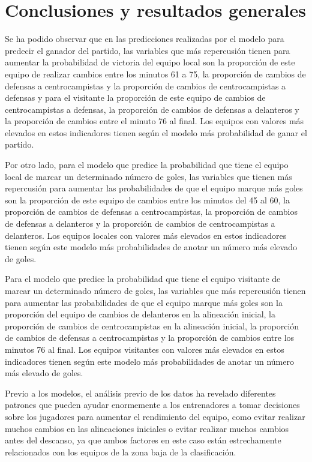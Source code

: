 \section{Conclusiones y resultados generales}
Se ha podido observar que en las predicciones realizadas por el modelo para predecir el ganador 
del partido, las variables que más repercusión tienen para aumentar la probabilidad de victoria del
equipo local son la proporción de este equipo de realizar cambios entre los minutos 61 a 75, la
proporción de cambios de defensas a centrocampistas y la proporción de cambios de
centrocampistas a defensas y para el visitante la proporción de este equipo de cambios de
centrocampistas a defensas, la proporción de cambios de defensas a delanteros y la proporción de 
cambios entre el minuto 76 al final. Los equipos con valores más elevados en estos indicadores 
tienen según el modelo más probabilidad de ganar el partido.

Por otro lado, para el modelo que predice la probabilidad que tiene el equipo local de marcar un 
determinado número de goles, las variables que tienen más repercusión para aumentar las 
probabilidades de que el equipo marque más goles son la proporción de este equipo de cambios 
entre los minutos del 45 al 60, la proporción de cambios de defensas a centrocampistas, la 
proporción de cambios de defensas a delanteros y la proporción de cambios de centrocampistas a 
delanteros. Los equipos locales con valores más elevados en estos indicadores tienen según este 
modelo más probabilidades de anotar un número más elevado de goles.

Para el modelo que predice la probabilidad que tiene el equipo visitante de marcar un determinado
número de goles, las variables que más repercusión tienen para aumentar las probabilidades de 
que el equipo marque más goles son la proporción del equipo de cambios de delanteros en la 
alineación inicial, la proporción de cambios de centrocampistas en la alineación inicial, la 
proporción de cambios de defensas a centrocampistas y la proporción de cambios entre los 
minutos 76 al final. Los equipos visitantes con valores más elevados en estos indicadores tienen 
según este modelo más probabilidades de anotar un número más elevado de goles.

Previo a los modelos, el análisis previo de los datos ha revelado diferentes patrones que pueden 
ayudar enormemente a los entrenadores a tomar decisiones sobre los jugadores para aumentar el 
rendimiento del equipo, como evitar realizar muchos cambios en las alineaciones iniciales o evitar 
realizar muchos cambios antes del descanso, ya que ambos factores en este caso están 
estrechamente relacionados con los equipos de la zona baja de la clasificación. 

